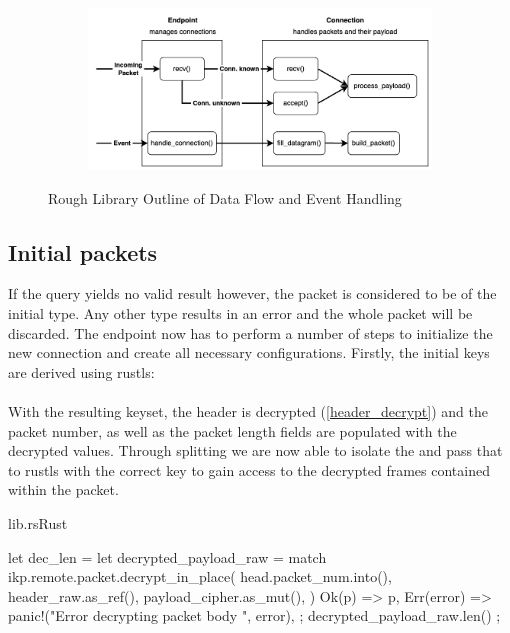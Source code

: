 \begin{figure}[h]
    \centering
    \begin{subfigure}[b]{1.0\textwidth}
      \includegraphics[width=1.0\linewidth]{img/lib_design.png}
    \end{subfigure}
    \caption{Rough Library Outline of Data Flow and Event Handling}
    \label{grafik_lib_design}
\end{figure}

\subsection{Initial packets} \label{initial_conn}

If the query yields no valid result however, the packet is considered to be of the initial type. Any other type results in an error and the
whole packet will be discarded. The endpoint now has to perform a number of steps to initialize the new connection and create all
necessary configurations. Firstly, the initial keys are derived using rustls: \\
 \\
With the resulting keyset, the header is decrypted (\ref{header_decrypt}) and the packet number, as well as the packet length fields are
populated with the decrypted values. Through splitting we are now able to isolate the  and pass that to rustls
with the correct key to gain access to the decrypted frames contained within the packet.

\begin{codeblock}{lib.rs}{Rust}
    \begin{rustcode}
        let dec_len = {
            let decrypted_payload_raw = match ikp.remote.packet.decrypt_in_place(
                head.packet_num.into(),
                header_raw.as_ref(),
                payload_cipher.as_mut(),
            ) {
                Ok(p) => p,
                Err(error) => panic!("Error decrypting packet body {}", error),
            };
            decrypted_payload_raw.len()
        };
    \end{rustcode}
\end{codeblock}


